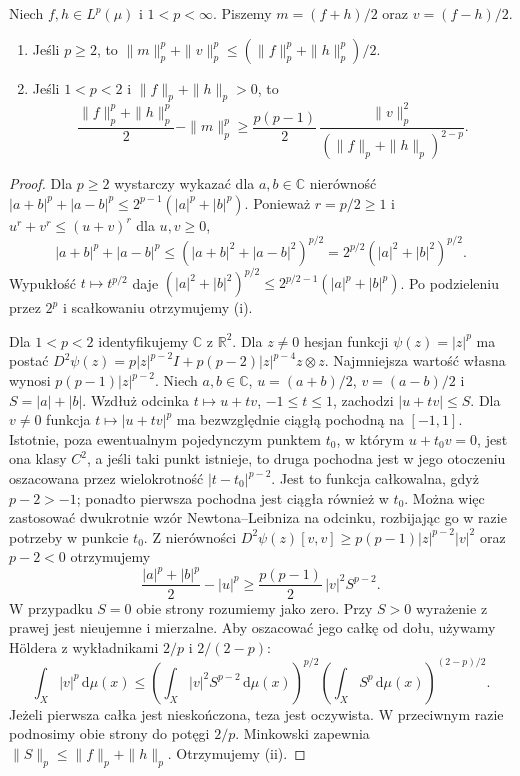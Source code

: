 \begin{lemat}
\label{lem:midpoint-lp-15}
Niech $f,h\in L^p(\mu)$ i $1<p<\infty$. Piszemy
$m=(f+h)/2$ oraz $v=(f-h)/2$.
\begin{enumerate}[label=\textup{(\roman*)}]
\item Jeśli $p\ge2$, to
$\|m\|_p^p+\|v\|_p^p\le(\|f\|_p^p+\|h\|_p^p)/2$.
\item Jeśli $1<p<2$ i $\|f\|_p+\|h\|_p>0$, to
\begin{equation}\label{eq:midpoint-low-15}
\frac{\|f\|_p^p+\|h\|_p^p}{2}-\|m\|_p^p
\ge \frac{p(p-1)}2\,
\frac{\|v\|_p^2}{(\|f\|_p+\|h\|_p)^{2-p}}.
\end{equation}
\end{enumerate}
\end{lemat}
\begin{proof}
Dla $p\ge2$ wystarczy wykazać dla $a,b\in\mathbb C$ nierówność
$|a+b|^p+|a-b|^p\le2^{p-1}(|a|^p+|b|^p)$.
Ponieważ $r=p/2\ge1$ i $u^r+v^r\le(u+v)^r$ dla $u,v\ge0$,
\[
|a+b|^p+|a-b|^p
\le (|a+b|^2+|a-b|^2)^{p/2}
=2^{p/2}(|a|^2+|b|^2)^{p/2}.
\]
Wypukłość $t\mapsto t^{p/2}$ daje
$(|a|^2+|b|^2)^{p/2}\le2^{p/2-1}(|a|^p+|b|^p)$.
Po podzieleniu przez $2^p$ i scałkowaniu otrzymujemy (i).

Dla $1<p<2$ identyfikujemy $\mathbb C$ z $\mathbb R^2$.
Dla $z\ne0$ hesjan funkcji $\psi(z)=|z|^p$ ma postać
$D^2\psi(z)=p|z|^{p-2}I+p(p-2)|z|^{p-4}z\otimes z$.
Najmniejsza wartość własna wynosi
$p(p-1)|z|^{p-2}$. Niech $a,b\in\mathbb C$,
$u=(a+b)/2$, $v=(a-b)/2$ i $S=|a|+|b|$.
Wzdłuż odcinka $t\mapsto u+tv$, $-1\le t\le1$,
zachodzi $|u+tv|\le S$. Dla $v\ne0$ funkcja
$t\mapsto |u+tv|^p$ ma bezwzględnie ciągłą pochodną
na $[-1,1]$. Istotnie, poza ewentualnym pojedynczym
punktem $t_0$, w którym $u+t_0v=0$, jest ona klasy $C^2$,
a jeśli taki punkt istnieje, to druga pochodna jest
w jego otoczeniu oszacowana przez wielokrotność
$|t-t_0|^{p-2}$. Jest to funkcja całkowalna, gdyż
$p-2>-1$; ponadto pierwsza pochodna jest ciągła
również w $t_0$. Można więc zastosować dwukrotnie
wzór Newtona--Leibniza na odcinku, rozbijając go
w razie potrzeby w punkcie $t_0$. Z nierówności
$D^2\psi(z)[v,v]\ge p(p-1)|z|^{p-2}|v|^2$
oraz $p-2<0$ otrzymujemy
\[
\frac{|a|^p+|b|^p}{2}-|u|^p
\ge \frac{p(p-1)}2\,|v|^2S^{p-2}.
\]
W przypadku $S=0$ obie strony rozumiemy jako zero.
Przy $S>0$ wyrażenie z prawej jest nieujemne i mierzalne.
Aby oszacować jego całkę od dołu, używamy Höldera
z wykładnikami $2/p$ i $2/(2-p)$:
\[
\int_X|v|^p\,\mathrm d\mu(x)
\le\left(\int_X |v|^2S^{p-2}\,\mathrm d\mu(x)\right)^{p/2}
\left(\int_XS^p\,\mathrm d\mu(x)\right)^{(2-p)/2}.
\]
Jeżeli pierwsza całka jest nieskończona, teza jest oczywista.
W przeciwnym razie podnosimy obie strony do potęgi $2/p$.
Minkowski zapewnia $\|S\|_p\le\|f\|_p+\|h\|_p$.
Otrzymujemy (ii).
\end{proof}

